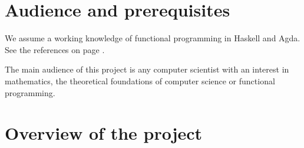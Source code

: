 \section*{Audience and prerequisites}

We assume a working knowledge of functional programming in Haskell and
Agda. See the references on page
\pageref{sec:introduction-references}.


The main audience of this project is any computer scientist with an
interest in mathematics, the theoretical foundations of computer
science or functional programming.






\section*{Overview of the project} %

